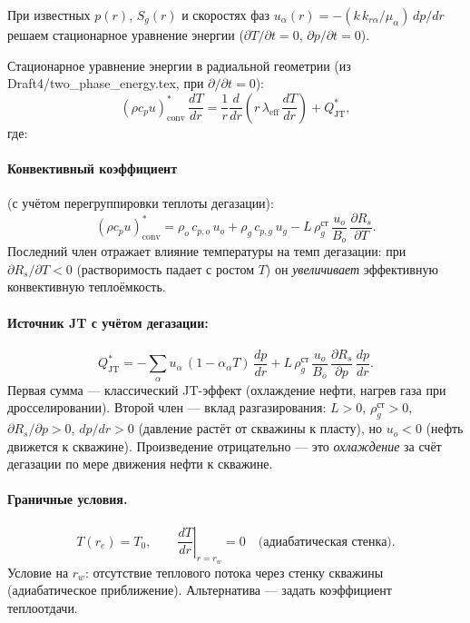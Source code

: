 ﻿\documentclass[12pt,a4paper]{article}
\begin{document}
При известных $p(r)$, $S_g(r)$ и скоростях
фаз $u_\alpha(r) = -(k\,k_{r\alpha}/\mu_\alpha)\,dp/dr$
решаем стационарное уравнение энергии ($\partial T/\partial t = 0$,
$\partial p/\partial t = 0$).

Стационарное уравнение энергии в радиальной геометрии
(из Draft4/two\_phase\_energy.tex, при $\partial/\partial t = 0$):
\begin{equation}\label{eq:energy_stat}
  (\rho c_p u)_{\mathrm{conv}}^*\,\frac{dT}{dr}
  = \frac{1}{r}\frac{d}{dr}\left(
    r\,\lambda_{\mathrm{eff}}\,\frac{dT}{dr}\right)
  + Q_{\mathrm{JT}}^*,
\end{equation}
где:

\paragraph{Конвективный коэффициент}
(с учётом перегруппировки теплоты дегазации):
\begin{equation}\label{eq:conv_star}
  (\rho c_p u)_{\mathrm{conv}}^*
  = \rho_o\,c_{p,o}\,u_o + \rho_g\,c_{p,g}\,u_g
  - L\,\rho_{g}^{\text{ст}}\,\frac{u_o}{B_o}\,
  \frac{\partial R_s}{\partial T}.
\end{equation}
Последний член отражает влияние температуры на темп
дегазации: при $\partial R_s/\partial T < 0$
(растворимость падает с ростом $T$) он \emph{увеличивает}
эффективную конвективную теплоёмкость.

\paragraph{Источник JT с учётом дегазации:}
\begin{equation}\label{eq:QJT_star}
  Q_{\mathrm{JT}}^*
  = -\sum_\alpha u_\alpha\,(1 - \alpha_\alpha T)\,
  \frac{dp}{dr}
  + L\,\rho_{g}^{\text{ст}}\,\frac{u_o}{B_o}\,
  \frac{\partial R_s}{\partial p}\,\frac{dp}{dr}.
\end{equation}
Первая сумма --- классический JT-эффект
(охлаждение нефти, нагрев газа при дросселировании).
Второй член --- вклад разгазирования:
$L > 0$, $\rho_g^{\text{ст}} > 0$,
$\partial R_s/\partial p > 0$, $dp/dr > 0$
(давление растёт от скважины к пласту),
но $u_o < 0$ (нефть движется к скважине).
Произведение отрицательно --- это \emph{охлаждение}
за счёт дегазации по мере движения нефти к скважине.

\paragraph{Граничные условия.}
\begin{equation}\label{eq:bc_T_stat}
  T(r_e) = T_0, \qquad
  \left.\frac{dT}{dr}\right|_{r=r_w} = 0
  \quad\text{(адиабатическая стенка)}.
\end{equation}
Условие на $r_w$: отсутствие теплового потока через
стенку скважины (адиабатическое приближение).
Альтернатива --- задать коэффициент теплоотдачи.
\end{document}
